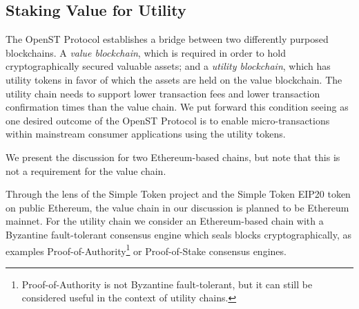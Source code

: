 \documentclass[12pt,a4paper, twocolumn]{article}
\begin{document}
\subsection{Staking Value for Utility}
The OpenST Protocol establishes a bridge between two differently purposed blockchains.  A \textit{value blockchain}, which is required in order to hold cryptographically secured valuable assets; and a \textit{utility blockchain}, which has utility tokens in favor of which the assets are held on the value blockchain.  The utility chain needs to support lower transaction fees and lower transaction confirmation times than the value chain.  We put forward this condition seeing as one desired outcome of the OpenST Protocol is to enable micro-transactions within mainstream consumer applications using the utility tokens. \par
We present the discussion for two Ethereum-based chains, but note that this is not a requirement for the value chain. \par
Through the lens of the Simple Token project and the Simple Token EIP20 token on public Ethereum, the value chain in our discussion is planned to be Ethereum mainnet.  For the utility chain we consider an Ethereum-based chain with a Byzantine fault-tolerant consensus engine which seals blocks cryptographically, as examples Proof-of-Authority\footnote{Proof-of-Authority is not Byzantine fault-tolerant, but it can still be considered useful in the context of utility chains.} or Proof-of-Stake consensus engines. \par
\end{document}

